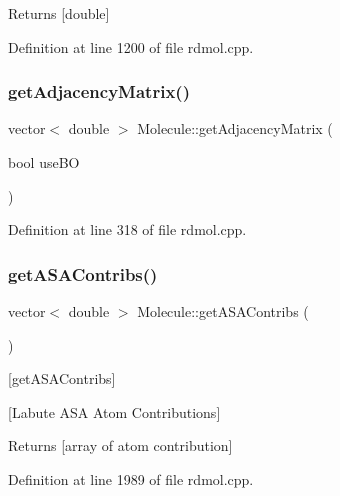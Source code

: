 \begin{DoxyReturn}{Returns}
\mbox{[}double\mbox{]} 
\end{DoxyReturn}


Definition at line 1200 of file rdmol.\+cpp.

\mbox{\label{class_molecule_a7ee37a53f63c296a206a20b69808cff8}} 
\subsubsection{\texorpdfstring{get\+Adjacency\+Matrix()}{getAdjacencyMatrix()}}
{\footnotesize\ttfamily vector$<$ double $>$ Molecule\+::get\+Adjacency\+Matrix (\begin{DoxyParamCaption}\item[{bool}]{use\+BO }\end{DoxyParamCaption})}



Definition at line 318 of file rdmol.\+cpp.

\mbox{\label{class_molecule_a6788d32036ced74e382310e93629b785}} 
\subsubsection{\texorpdfstring{get\+A\+S\+A\+Contribs()}{getASAContribs()}}
{\footnotesize\ttfamily vector$<$ double $>$ Molecule\+::get\+A\+S\+A\+Contribs (\begin{DoxyParamCaption}{ }\end{DoxyParamCaption})}



\mbox{[}get\+A\+S\+A\+Contribs\mbox{]} 

\mbox{[}Labute A\+SA Atom Contributions\mbox{]} \begin{DoxyReturn}{Returns}
\mbox{[}array of atom contribution\mbox{]} 
\end{DoxyReturn}


Definition at line 1989 of file rdmol.\+cpp.

\mbox{\label{class_molecule_a4123cb22770fc42287562a16affa5ba5}} 
